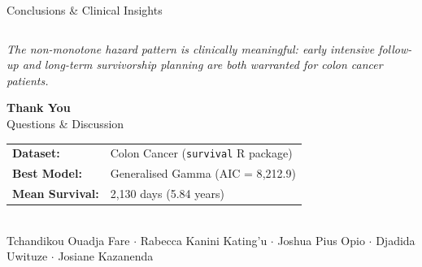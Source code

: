 \documentclass[aspectratio=169, 11pt]{beamer}
\begin{document}
\begin{frame}{Conclusions \& Clinical Insights}
\begin{columns}[T]
\end{columns}

\vspace{10pt}
\begin{center}
  \small
  \textit{The non-monotone hazard pattern is clinically meaningful:
  early intensive follow-up and long-term survivorship planning
  are both warranted for colon cancer patients.}
\end{center}

\end{frame}

{
\begin{frame}[plain]
  \vspace{2.5cm}
  \begin{center}
    {\Large \textbf{Thank You}}\\[8pt]
    {\normalsize Questions \& Discussion}\\[20pt]
    \small
    \begin{tabular}{ll}
      \textbf{Dataset:}        & Colon Cancer (\texttt{survival} R package) \\
      \textbf{Best Model:}     & Generalised Gamma (AIC = 8{,}212.9)        \\
      \textbf{Mean Survival:}  & 2{,}130 days (5.84 years)                  \\
    \end{tabular}\\[16pt]
    \footnotesize
    Tchandikou Ouadja Fare $\cdot$
    Rabecca Kanini Kating'u $\cdot$
    Joshua Pius Opio $\cdot$
    Djadida Uwituze $\cdot$
    Josiane Kazanenda
  \end{center}
\end{frame}
}
\end{document}
